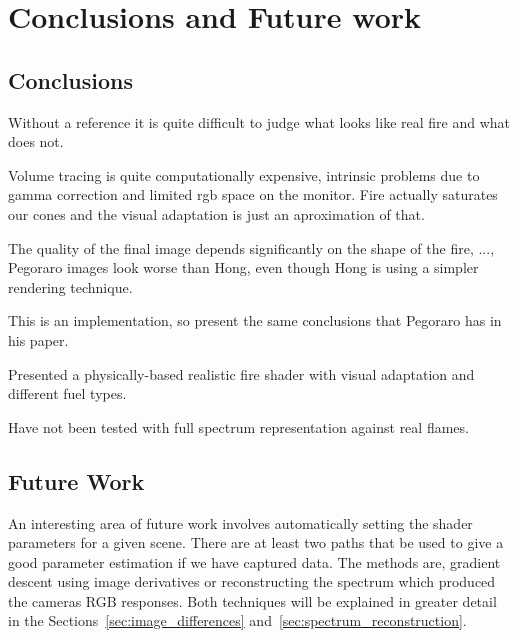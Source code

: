 \chapter{Conclusions and Future work}
\label{ch:conclusions}

\section{Conclusions}

Without a reference it is quite difficult to judge what looks like real fire and what does not.

Volume tracing is quite computationally expensive, intrinsic problems due to gamma correction and limited rgb space on the monitor.
Fire actually saturates our cones and the visual adaptation is just an aproximation of that.

The quality of the final image depends significantly on the shape of the fire, ..., Pegoraro images look worse than Hong, even though Hong is using a simpler rendering technique.

This is an implementation, so present the same conclusions that Pegoraro has in his paper.

Presented a physically-based realistic fire shader with visual adaptation and different fuel types.

Have not been tested with full spectrum representation against real flames.

\section{Future Work}

An interesting area of future work involves automatically setting the shader parameters for a given scene.
There are at least two paths that be used to give a good parameter estimation if we have captured data.
The methods are, gradient descent using image derivatives or reconstructing the spectrum which produced the cameras RGB responses.
Both techniques will be explained in greater detail in the Sections~\ref{sec:image_differences} and~\ref{sec:spectrum_reconstruction}.

